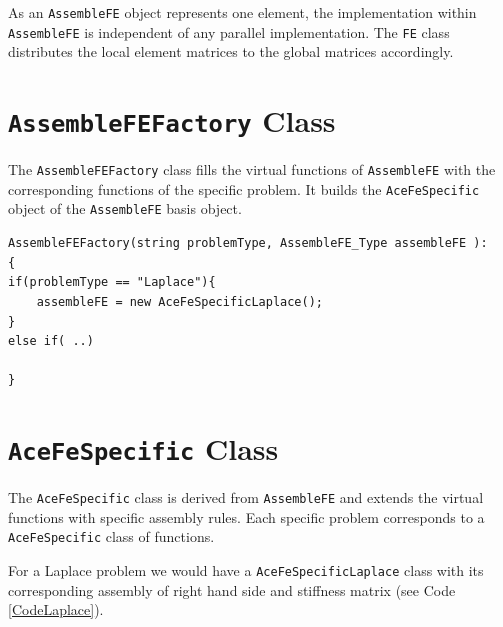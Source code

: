 As an \texttt{AssembleFE} object represents one element, the implementation within \texttt{AssembleFE} is independent of any parallel implementation. The \texttt{FE} class distributes the local element matrices to the global matrices accordingly.

\section{\texttt{AssembleFEFactory} Class}
The \texttt{AssembleFEFactory} class fills the virtual functions of \texttt{AssembleFE} with the corresponding functions of the specific problem.
It builds the \texttt{AceFeSpecific} object of the \texttt{AssembleFE} basis object. 
\begin{lstlisting}
AssembleFEFactory(string problemType, AssembleFE_Type assembleFE ):
{
if(problemType == "Laplace"){
	assembleFE = new AceFeSpecificLaplace();
}
else if( ..)

}
\end{lstlisting}

\section{\texttt{AceFeSpecific} Class}

The \texttt{AceFeSpecific} class is derived from \texttt{AssembleFE} and extends the virtual functions with specific assembly rules.
Each specific problem corresponds to a \texttt{AceFeSpecific} class of functions. 

For a Laplace problem we would have a \texttt{AceFeSpecificLaplace} class with its corresponding assembly of right hand side and stiffness matrix (see Code \ref{CodeLaplace}).
 ~~\\
 
